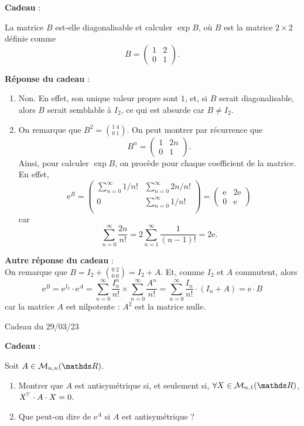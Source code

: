 \documentclass[a4paper]{article}
\begin{document}
	\bigskip
	\bigskip
	\bigskip
	\textbf{Cadeau} :\\
	\begin{slshape}
		La matrice $B$ est-elle diagonalisable et calculer $\exp B$, où $B$ est la matrice $2 \times 2$ définie comme \[
			B = \begin{pmatrix}
				1 & 2\\
				0 & 1
			\end{pmatrix}
		.\]
	\end{slshape}

	\bigskip\bigskip
	\textbf{Réponse du cadeau} :\\
	\begin{enumerate}
		\item Non. En effet, son unique valeur propre sont $1$, et, si $B$ serait diagonalisable, alors $B$ serait semblable à $I_2$, ce qui est absurde car $B \neq I_2$.
		\item On remarque que $B^2 = {1\:4\choose 0\:1}$. On peut montrer par récurrence que \[
			B^n = \begin{pmatrix}
				1 & 2n\\
				0 & 1
			\end{pmatrix}
		.\]
		Ainsi, pour calculer $\exp B$, on procède pour chaque coefficient de la matrice.
		En effet, \[
			\mathrm{e}^B = \begin{pmatrix}
				\sum_{n=0}^\infty 1/n! & \sum_{n=0}^\infty 2n/n!\\
				0 &\sum_{n=0}^\infty 1/n!\\
			\end{pmatrix} = \begin{pmatrix}
				\mathrm{e} & 2 \mathrm{e}\\
				0 & \mathrm{e}
			\end{pmatrix}
		\] car \[
			\sum_{n=0}^\infty \frac{2n}{n!} = 2 \sum_{n=1}^\infty \frac{1}{(n-1)!} = 2 \mathrm{e}
		.\]
	\end{enumerate}

	\textbf{Autre réponse du cadeau} :\\
	On remarque que $B = I_2 + { 0 \: 2 \choose 0 \: 0 } = I_2 + A$.
	Et, comme $I_2$ et $A$ commutent, alors \[
		\mathrm{e}^B = \mathrm{e}^{I_2} \cdot \mathrm{e}^A = \sum_{n=0}^\infty \frac{I_n^n}{n!} \times \sum_{n=0}^\infty \frac{A^n}{n!} = \sum_{n=0}^\infty \frac{I_n}{n!} \cdot (I_n + A) = \mathrm{e} \cdot B
	\] car la matrice $A$ est nilpotente : $A^2$ est la matrice nulle.
	\clearpage
	\centerline{\LARGE Cadeau du 29/03/23}

	\bigskip
	\bigskip
	\bigskip
	\textbf{Cadeau} :\\
	\begin{slshape}
		Soit $A \in \mathcal{M}_{n,n}(\R)$.
		\begin{enumerate}
			\item Montrer que $A$ est antisymétrique si, et seulement si, $\forall X \in \mathcal{M}_{n,1}(\R)$, $X^{\!\!\,\top} \cdot A \cdot X = 0$.
			\item Que peut-on dire de $\mathrm{e}^A$ si $A$ est antisymétrique ?
		\end{enumerate}
	\end{slshape}
\end{document}
